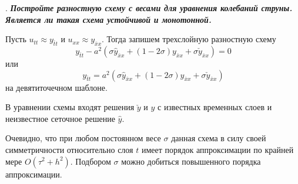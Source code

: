 \documentclass[12pt, a4paper]{article}
\newcommand{\widecheck}[1]{\check{#1}}
\newcounter{mycounter}
\newcommand{\quastion}[1]{%
	\stepcounter{mycounter}%
	\textbf{\themycounter}.  %
	\textbf{\textit{#1}}
	
}
\begin{document}
	\quastion{Постройте разностную схему с весами для уравнения колебаний струны. Является ли такая схема устойчивой и монотонной.}
	
	Пусть $u_{tt} \approx y_{\bar{t}t} $ и $u_{xx} \approx y_{\bar{x}x} $. Тогда запишем трехслойную разностную схему
	\begin{equation}
		y_{\bar{t}t} - a^2 (\sigma \hat{y}_{\bar{x}x} + (1 - 2 \sigma) y_{\bar{x}x} + \sigma \widecheck{y}_{\bar{x}x}) = 0
	\end{equation}
	или
	\begin{equation*}
		y_{\bar{t}t} = a^2 (\sigma \hat{y}_{\bar{x}x} + (1 - 2 \sigma) y_{\bar{x}x} + \sigma \widecheck{y}_{\bar{x}x})
	\end{equation*}
	на девятиточечном шаблоне. 
	
	В уравнении схемы входят решения $\widecheck{y}$ и $y$ с известных временных слоев и неизвестное сеточное решение $\hat{y}$.
	
	Очевидно, что при любом постоянном весе $\sigma$ данная схема в силу своей симметричности относительно слоя $t$ имеет порядок аппроксимации по крайней мере $O(\tau^2 + h^2)$. Подбором $\sigma$ можно добиться повышенного порядка аппроксимации. 
	
\end{document}
